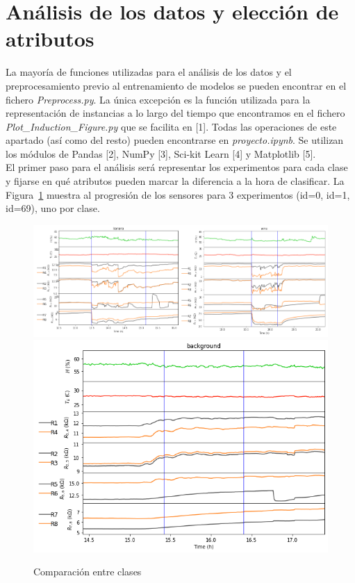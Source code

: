 \documentclass{esannV2}
\begin{document}
\section{Análisis  de los datos y elección de atributos}
La mayoría de funciones utilizadas para el análisis de los datos y el preprocesamiento previo al entrenamiento de modelos se pueden encontrar en el fichero \textit{Preprocess.py}. La única excepción es la función utilizada para la representación de instancias a lo largo del tiempo que encontramos en el fichero \\ \textit{Plot\_Induction\_Figure.py} que se facilita en [1]. Todas las operaciones de este apartado (así como del resto) pueden encontrarse en \textit{proyecto.ipynb}. Se utilizan los módulos de Pandas [2], NumPy [3], Sci-kit Learn [4] y Matplotlib [5]. \\
El primer paso para el análisis será representar los experimentos para cada clase y fijarse en qué atributos pueden marcar la diferencia a la hora de clasificar. La Figura~\ref{fig:banvswinvsbck} muestra al progresión de los sensores para 3 experimentos (id=0, id=1, id=69), uno por clase. \\

\begin{figure}[b!]
\includegraphics[scale=0.35]{img/banvswin.png}
\centering
\includegraphics[scale=0.3]{img/background_69.png}
\caption{Comparación entre clases}\label{fig:banvswinvsbck}
\end{figure}
\end{document}
